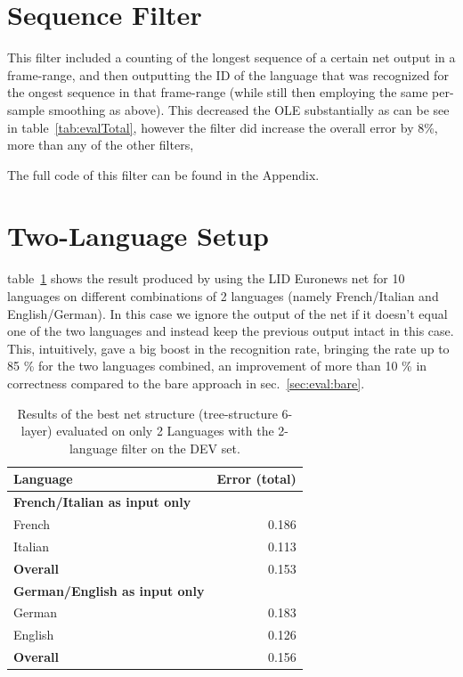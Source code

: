 \section{Sequence Filter}
\label{sec:eval:seq}
This filter included a counting of the longest sequence of a certain net output in a frame-range, and then outputting the ID of the language that was recognized for the ongest sequence in that frame-range (while still then employing the same per-sample smoothing as above). This decreased the OLE substantially as can be see in table~\ref{tab:evalTotal}, however the filter did increase the overall error by 8\%, more than any of the other filters, 

The full code of this filter can be found in the Appendix.


\section{Two-Language Setup}
\label{sec:eval:2L}
table~\ref{tab:eval2L} shows the result produced by using the LID Euronews net for 10 languages on different combinations of 2 languages (namely French/Italian and English/German). In this case we ignore the output of the net if it doesn't equal one of the two languages and instead keep the previous output intact in this case. This, intuitively, gave a big boost in the recognition rate, bringing the rate up to 85 \% for the two languages combined, an improvement of more than 10 \% in correctness compared to the bare approach in sec.~\ref{sec:eval:bare}.

\begin{table}[h!]
\caption{Results of the best net structure (tree-structure 6-layer) evaluated on only 2 Languages with the 2-language filter on the DEV set.}
\label{tab:eval2L}
\centering
\begin{tabular}{| l | r |}
	\hline
	\textbf{Language} & \textbf{Error (total)}  \\
	\hline
	\textbf{French/Italian as input only} & \\
	 French &  0.186 \\
	Italian & 0.113 \\
	\hline
	\textbf{Overall} & 0.153 \\
	\hline
	\textbf{German/English as input only} & \\
	German & 0.183 \\
	English & 0.126 \\
	\hline
	\textbf{Overall} & 0.156 \\
	\hline
\end{tabular}
\end{table}

